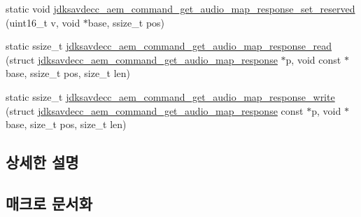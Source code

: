\begin{DoxyCompactItemize}
\item 
static void \hyperlink{group__command__get__audio__map__response_ga3e48f8a9778c49983e081b53e253c280}{jdksavdecc\+\_\+aem\+\_\+command\+\_\+get\+\_\+audio\+\_\+map\+\_\+response\+\_\+set\+\_\+reserved} (uint16\+\_\+t v, void $\ast$base, ssize\+\_\+t pos)
\item 
static ssize\+\_\+t \hyperlink{group__command__get__audio__map__response_gaa5c9113e9338a304ff217f3ea6cd92d2}{jdksavdecc\+\_\+aem\+\_\+command\+\_\+get\+\_\+audio\+\_\+map\+\_\+response\+\_\+read} (struct \hyperlink{structjdksavdecc__aem__command__get__audio__map__response}{jdksavdecc\+\_\+aem\+\_\+command\+\_\+get\+\_\+audio\+\_\+map\+\_\+response} $\ast$p, void const $\ast$base, ssize\+\_\+t pos, size\+\_\+t len)
\item 
static ssize\+\_\+t \hyperlink{group__command__get__audio__map__response_ga6c90983c36ab94e4d3e15193dfcb2aa5}{jdksavdecc\+\_\+aem\+\_\+command\+\_\+get\+\_\+audio\+\_\+map\+\_\+response\+\_\+write} (struct \hyperlink{structjdksavdecc__aem__command__get__audio__map__response}{jdksavdecc\+\_\+aem\+\_\+command\+\_\+get\+\_\+audio\+\_\+map\+\_\+response} const $\ast$p, void $\ast$base, size\+\_\+t pos, size\+\_\+t len)
\end{DoxyCompactItemize}


\subsection{상세한 설명}


\subsection{매크로 문서화}
